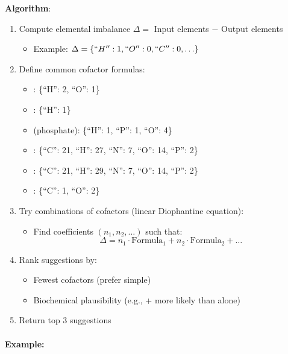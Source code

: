\textbf{Algorithm}:

\begin{enumerate}
    \item Compute elemental imbalance $\Delta =$ Input elements $-$ Output elements
    \begin{itemize}
        \item Example: $\Delta = \{``H'': 1, ``O'': 0, ``C'': 0, \ldots\}$
    \end{itemize}
    
    \item Define common cofactor formulas:
    \begin{itemize}
        \item {}: \{``H'': 2, ``O'': 1\}
        \item {}: \{``H'': 1\}
        \item {} (phosphate): \{``H'': 1, ``P'': 1, ``O'': 4\}
        \item {}: \{``C'': 21, ``H'': 27, ``N'': 7, ``O'': 14, ``P'': 2\}
        \item {}: \{``C'': 21, ``H'': 29, ``N'': 7, ``O'': 14, ``P'': 2\}
        \item {}: \{``C'': 1, ``O'': 2\}
    \end{itemize}
    
    \item Try combinations of cofactors (linear Diophantine equation):
    \begin{itemize}
        \item Find coefficients $(n_1, n_2, \ldots)$ such that:
        \begin{equation}
        \Delta = n_1 \cdot \text{Formula}_1 + n_2 \cdot \text{Formula}_2 + \ldots
        \end{equation}
    \end{itemize}
    
    \item Rank suggestions by:
    \begin{itemize}
        \item Fewest cofactors (prefer simple)
        \item Biochemical plausibility (e.g.,  +  more likely than  alone)
    \end{itemize}
    
    \item Return top 3 suggestions
\end{enumerate}

\paragraph{Example:}

